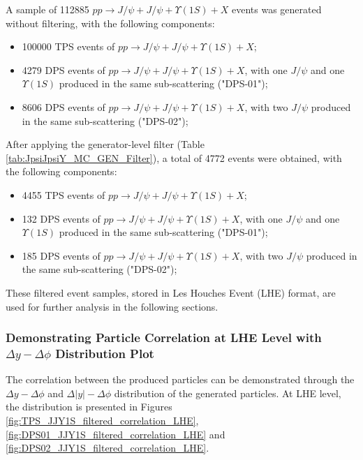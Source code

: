 \documentclass[10pt,twocolumn]{article}
\begin{document}
A sample of 112885 $pp\to J/\psi+J/\psi+\Upsilon(1S)+X$ events was generated without filtering, with the following components:

\begin{itemize}
    \item 100000 TPS events of $pp\to J/\psi+J/\psi+\Upsilon(1S)+X$;
    \item 4279 DPS events of $pp\to J/\psi+J/\psi+\Upsilon(1S)+X$, with one $J/\psi$ and one $\Upsilon(1S)$ produced in the same sub-scattering ("DPS-01");
    \item 8606 DPS events of $pp\to J/\psi+J/\psi+\Upsilon(1S)+X$, with two $J/\psi$ produced in the same sub-scattering ("DPS-02");
\end{itemize}

After applying the generator-level filter (Table \ref{tab:JpsiJpsiY_MC_GEN_Filter}), a total of 4772 events were obtained, with the following components:

\begin{itemize}
    \item 4455 TPS events of $pp\to J/\psi+J/\psi+\Upsilon(1S)+X$;
    \item 132 DPS events of $pp\to J/\psi+J/\psi+\Upsilon(1S)+X$, with one $J/\psi$ and one $\Upsilon(1S)$ produced in the same sub-scattering ("DPS-01");
    \item 185 DPS events of $pp\to J/\psi+J/\psi+\Upsilon(1S)+X$, with two $J/\psi$ produced in the same sub-scattering ("DPS-02");
\end{itemize}

These filtered event samples, stored in Les Houches Event (LHE) format, are used for further analysis in the following sections.

\subsubsection{Demonstrating Particle Correlation at LHE Level with \texorpdfstring{$\Delta y - \Delta \phi$}{Delta y - Delta phi} Distribution Plot}

The correlation between the produced particles can be demonstrated through the $\Delta y - \Delta \phi$ and $\Delta |y| - \Delta \phi$ distribution of the generated particles. At LHE level, the distribution is presented in Figures \ref{fig:TPS_JJY1S_filtered_correlation_LHE}, \ref{fig:DPS01_JJY1S_filtered_correlation_LHE} and \ref{fig:DPS02_JJY1S_filtered_correlation_LHE}.
\end{document}
